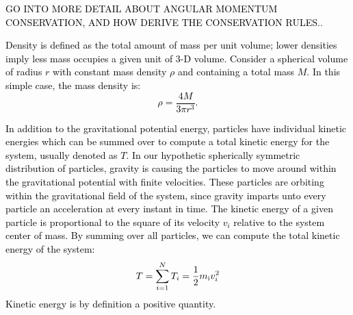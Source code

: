 \documentclass[main.tex]{subfiles}
\begin{document}
\begin{tcolorbox}[sharp corners, colback=green!30, colframe=green!80!blue, title=Box \refstepcounter{educhap2}\label{boxchap2:angII}\ref{boxchap2:angII} -- Angular Momentum II]
\par \textcolor{black} {GO INTO MORE DETAIL ABOUT ANGULAR MOMENTUM CONSERVATION, AND HOW DERIVE THE CONSERVATION RULES.}.  
\end{tcolorbox}


\begin{tcolorbox}[sharp corners, colback=blue!30, colframe=blue!80!blue, title=Box \refstepcounter{educhap2}\label{boxchap2:massdensity}\ref{boxchap2:massdensity} -- Mass Density]
\par \textcolor{black} {Density is defined as the total amount of mass per unit volume; lower densities imply less mass occupies a given unit of 3-D volume.  Consider a spherical volume of radius $r$ with constant mass density $\rho$ and containing a total mass $M$.  In this simple case, the mass density is:
\begin{equation}
\rho = \frac{4M}{3{\pi}r^3}.
\end{equation}
}  
\end{tcolorbox}






\begin{tcolorbox}[sharp corners, colback=blue!30, colframe=blue!80!blue, title=Box \refstepcounter{educhap2}\label{boxchap2:KE}\ref{boxchap2:KE} -- Kinetic Energy]
\par \textcolor{black} {In addition to the gravitational potential energy, particles have individual kinetic energies which can be summed over to compute a total kinetic energy for the system, usually denoted as $T$.  In our hypothetic spherically symmetric distribution of particles, gravity is causing the particles to move around within the gravitational potential with finite velocities.  These particles are orbiting within the gravitational field of the system, since gravity imparts unto every particle an acceleration at every instant in time.  The kinetic energy of a given particle is proportional to the square of its velocity $v_i$ relative to the system center of mass.  By summing over all particles, we can compute the total kinetic energy of the system:
\begin{equation}
T = \sum_{i=1}^{N} T_{i} = \frac{1}{2}m_{\rm i}v_i^2
\end{equation}
Kinetic energy is by definition a positive quantity.}  
\end{tcolorbox}
\end{document}
